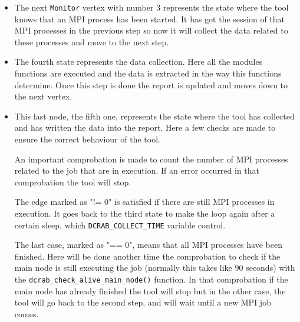 \documentclass[10pt,a4paper]{report}
\begin{document}
\begin{itemize}
\begin{itemize}
    \item The next \verb+Monitor+ vertex with number 3 represents the state where the tool knows that an MPI process has been started. It has got the session of that MPI processes in the previous step so now it will collect the data related to these processes and move to the next step.
    \item The fourth state represents the data collection. Here all the modules functions are executed and the data is extracted in the way this functions determine. Once this step is done the report is updated and moves down to the next vertex.
    \item This last node, the fifth one, represents the state where the tool has collected and has written the data into the report. Here a few checks are made to ensure the correct behaviour of the tool.

    An important comprobation is made to count the number of MPI processes related to the job that are in execution. If an error occurred in that comprobation the tool will stop.

    The edge marked as "!= 0" is satisfied if there are still MPI processes in execution. It goes back to the third state to make the loop again after a certain sleep, which \verb+DCRAB_COLLECT_TIME+ variable control.

    The last case, marked as "== 0", means that all MPI processes have been finished. Here will be done another time the comprobation to check if the main node is still executing the job (normally this takes like 90 seconds) with the \texttt{dcrab\_check\_alive\_main\_node()} function. In that comprobation if the main node has already finished the tool will stop but in the other case, the tool will go back to the second step, and will wait until a new MPI job comes.
  \end{itemize}


\end{itemize}
\end{document}
